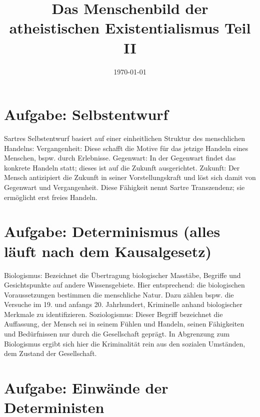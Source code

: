 \documentclass[12pt, letterpaper, twoside]{article}
\title{Das Menschenbild der atheistischen Existentialismus Teil II}
\date{\today}
\begin{document}
\maketitle

\begin{flushleft}


\section{Aufgabe: Selbstentwurf}

Sartres Selbstentwurf basiert auf einer einheitlichen Struktur des menschlichen Handelns:
Vergangenheit: Diese schafft die Motive für das jetzige Handeln eines Menschen, bspw. durch Erlebnisse.
Gegenwart: In der Gegenwart findet das konkrete Handeln statt; dieses ist auf die Zukunft ausgerichtet.
Zukunft: Der Mensch antizipiert die Zukunft in seiner Vorstellungskraft und löst sich damit von
Gegenwart und Vergangenheit. Diese Fähigkeit nennt Sartre Transzendenz; sie ermöglicht erst freies Handeln.


\section{Aufgabe: Determinismus (alles läuft nach dem Kausalgesetz)}

Biologismus: Bezeichnet die Übertragung biologischer Masstäbe, Begriffe und Gesichtspunkte auf andere
Wissensgebiete. Hier entsprechend: die biologischen Voraussetzungen bestimmen die menschliche Natur.
Dazu zählen bspw. die Versuche im 19. und anfangs 20. Jahrhundert, Kriminelle anhand biologischer
Merkmale zu identifizieren.
Soziologismus: Dieser Begriff bezeichnet die Auffassung, der Mensch sei in seinem Fühlen und Handeln,
seinen Fähigkeiten und Bedürfnissen nur durch die Gesellschaft geprägt.
In Abgrenzung zum Biologismus ergibt sich hier die Kriminalität rein aus den sozialen Umständen,
dem Zustand der Gesellschaft.

\pagebreak

\section{Aufgabe: Einwände der Deterministen}


\end{flushleft}
\end{document}
